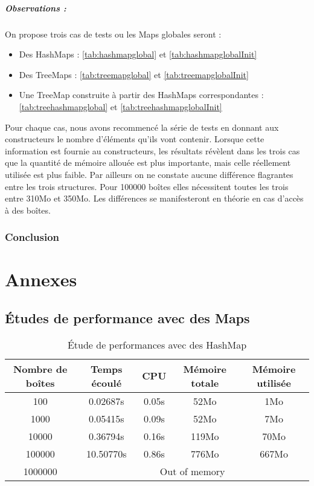 \paragraph{Observations :}
On propose trois cas de tests ou les Maps globales seront :
\begin{itemize}
  \item Des HashMaps :  \ref{tab:hashmapglobal} et \ref{tab:hashmapglobalInit}
  \item Des TreeMaps :  \ref{tab:treemapglobal} et \ref{tab:treemapglobalInit}
  \item Une TreeMap construite à partir des HashMaps correspondantes : \ref{tab:treehashmapglobal} et \ref{tab:treehashmapglobalInit}
\end{itemize}
 Pour chaque cas, nous avons recommencé la série de tests en donnant aux constructeurs le nombre d'éléments qu'ils vont contenir. Lorsque cette information est fournie au constructeurs, les résultats révèlent dans les trois cas que la quantité de mémoire allouée est plus importante, mais celle réellement utilisée est plus faible. Par ailleurs on ne constate aucune différence flagrantes entre les trois structures. Pour 100000 boîtes elles nécessitent toutes les trois entre 310Mo et 350Mo. Les différences se manifesteront en théorie  en cas d'accès à des boîtes.
 
\subsection{Conclusion}


\appendix
\chapter{Annexes}
\section{Études de performance avec des Maps}

\begin{table}[htpb]
  \centering
\begin{tabular}{|c|c|c|c|c|}
\hline
Nombre de boîtes & Temps écoulé & CPU & Mémoire totale & Mémoire utilisée\\
\hline
100 & 0.02687s & 0.05s & 52Mo & 1Mo\\
\hline
1000 & 0.05415s & 0.09s & 52Mo & 7Mo\\
\hline
10000 & 0.36794s & 0.16s & 119Mo & 70Mo\\
\hline
100000 & 10.50770s & 0.86s & 776Mo & 667Mo\\
\hline
1000000 & \multicolumn{4}{|c|}{Out of memory}\\
\hline
\end{tabular}
\caption{Étude de performances avec des HashMap}
\label{tab:hashmap1}
\end{table}

